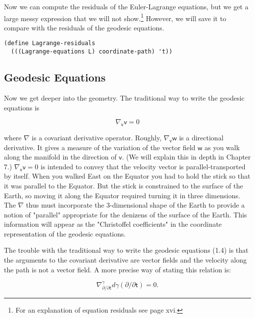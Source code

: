 \documentclass[11pt]{article}
\begin{document}
Now we can compute the residuals of the Euler-Lagrange equations, but we get
a large messy expression that we will not show.\footnote{For an explanation of equation residuals see page xvi.} However, we will save it to
compare with the residuals of the geodesic equations.

\begin{verbatim}
(define Lagrange-residuals
  (((Lagrange-equations L) coordinate-path) 't))
\end{verbatim}

\subsection{Geodesic Equations}
\label{sec:org05de7fc}

Now we get deeper into the geometry. The traditional way to write the
geodesic equations is

\begin{equation}
\nabla_{\mathsf{v}} \mathsf{v}=0
\end{equation}

where \(\nabla\) is a covariant derivative operator. Roughly,
\(\nabla_{\mathsf{v}} \mathsf{w}\) is a directional derivative. It gives a
measure of the variation of the vector field \(\mathsf{w}\) as you walk along
the manifold in the direction of \(\mathsf{v}\). (We will explain this in depth
in Chapter 7.) \(\nabla_{\mathsf{v}} \mathsf{v}=0\) is intended to convey that
the velocity vector is parallel-transported by itself. When you walked East
on the Equator you had to hold the stick so that it was parallel to the
Equator. But the stick is constrained to the surface of the Earth, so moving
it along the Equator required turning it in three dimensions. The \(\nabla\)
thus must incorporate the 3-dimensional shape of the Earth to provide a
notion of "parallel" appropriate for the denizens of the surface of the
Earth. This information will appear as the "Christoffel coefficients" in the
coordinate representation of the geodesic equations.

The trouble with the traditional way to write the geodesic equations (1.4) is
that the arguments to the covariant derivative are vector fields and the
velocity along the path is not a vector field. A more precise way of stating
this relation is:

\begin{equation}
\nabla^\gamma_{\partial/\partial\mathsf{t}} d\gamma\left(\partial/\partial \mathsf{t}\right) = 0.
\end{equation}
\end{document}
